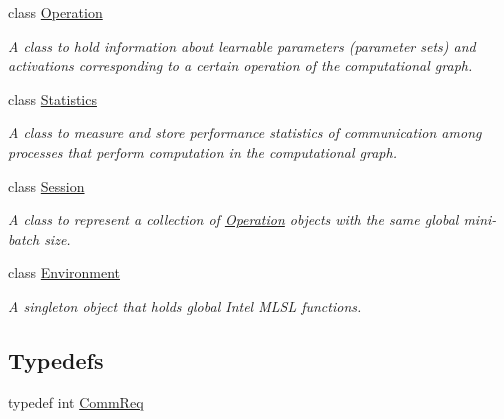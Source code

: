 \begin{DoxyCompactItemize}
class \hyperlink{classMLSL_1_1Operation}{Operation}
\begin{DoxyCompactList}\small\item\em A class to hold information about learnable parameters (parameter sets) and activations corresponding to a certain operation of the computational graph. \end{DoxyCompactList}\item 
class \hyperlink{classMLSL_1_1Statistics}{Statistics}
\begin{DoxyCompactList}\small\item\em A class to measure and store performance statistics of communication among processes that perform computation in the computational graph. \end{DoxyCompactList}\item 
class \hyperlink{classMLSL_1_1Session}{Session}
\begin{DoxyCompactList}\small\item\em A class to represent a collection of \hyperlink{classMLSL_1_1Operation}{Operation} objects with the same global mini-\/batch size. \end{DoxyCompactList}\item 
class \hyperlink{classMLSL_1_1Environment}{Environment}
\begin{DoxyCompactList}\small\item\em A singleton object that holds global Intel M\-L\-S\-L functions. \end{DoxyCompactList}\end{DoxyCompactItemize}
\subsection*{Typedefs}
\begin{DoxyCompactItemize}
\item 
typedef int \hyperlink{namespaceMLSL_aaf6e40eb1d3e48bb109f529d625e4087}{Comm\-Req}
\end{DoxyCompactItemize}
